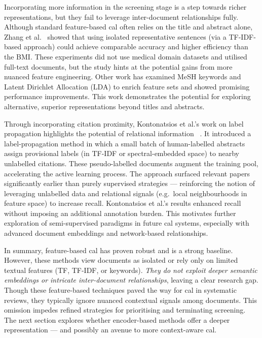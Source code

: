 \documentclass[10pt,oneside]{book}
\begin{document}
Incorporating more information in the screening stage is a step towards richer representations, but they fail to leverage inter-document relationships fully. Although standard feature-based \gls*{cal} often relies on the title and abstract alone, Zhang et al.~\cite{zhang_evaluating_2020} showed that using isolated representative sentences (via a TF-IDF-based approach) could achieve comparable accuracy and higher efficiency than the BMI. These experiments did not use medical domain datasets and utilised full-text documents, but the study hints at the potential gains from more nuanced feature engineering. Other work has examined MeSH keywords \cite{miwa_reducing_2014} and Latent Dirichlet Allocation (LDA) \cite{hashimoto_topic_2016, miwa_reducing_2014} to enrich feature sets and showed promising performance improvements. This work demonstrates the potential for exploring alternative, superior representations beyond titles and abstracts.

Through incorporating citation proximity, Kontonatsios et al.'s work on label propagation highlights the potential of relational information ~\cite{kontonatsios_semi-supervised_2017}. It introduced a label-propagation method in which a small batch of human-labelled abstracts assign provisional labels (in TF-IDF or spectral-embedded space) to nearby unlabelled citations. These pseudo-labelled documents augment the training pool, accelerating the active learning process. The approach surfaced relevant papers significantly earlier than purely supervised strategies — reinforcing the notion of leveraging unlabelled data and relational signals (e.g.\ local neighbourhoods in feature space) to increase recall. Kontonatsios et al.’s results enhanced recall without imposing an additional annotation burden. This motivates further exploration of semi-supervised paradigms in future \gls*{cal} systems, especially with advanced document embeddings and network-based relationships.

In summary, feature-based \gls*{cal} has proven robust and is a strong baseline.  However, these methods view documents as isolated or rely only on limited textual features (TF, TF-IDF, or keywords). \emph{They do not exploit deeper semantic embeddings or intricate inter-document relationships}, leaving a clear research gap. Though these feature-based techniques paved the way for \gls*{cal} in systematic reviews, they typically ignore nuanced contextual signals among documents. This omission impedes refined strategies for prioritising and terminating screening. The next section explores whether encoder-based methods offer a deeper representation — and possibly an avenue to more context-aware \gls*{cal}.
\end{document}
